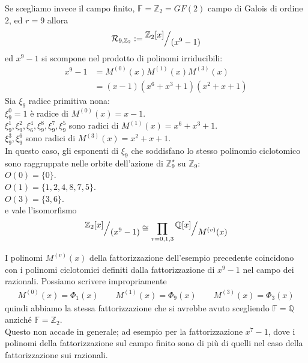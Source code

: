 \begin{esempio} \label{ese:fattor2_9}
Se scegliamo invece il campo finito,
$\mathbb{F} = \mathbb{Z}_{2} = GF(2)$ campo di Galois di ordine $2$, ed
$r = 9$ allora
\begin{align*}
  \mathcal{R}_{9, \mathbb{Z}_{2}} 
       := \quotient{\mathbb{Z}_{2} \lbrack x \rbrack  }{(x^{9} - 1)} 
\end{align*}
ed $x^{9}-1$ si scompone nel prodotto di polinomi irriducibili:
\begin{align*}
  x^9 - 1 &= M^{(0)}(x) M^{(1)}(x) M^{(3)}(x) \\
          &= (x-1)(x^6+x^3+1)(x^2+x+1)
\end{align*}
Sia $\xi_{9}$ radice primitiva nona:\\
$\xi_{9}^{0} = 1$ è radice di $M^{(0)}(x)= x-1$.\\
$\xi_{9}^{1},\xi_{9}^{2}, \xi_{6}^{4}, \xi_{9}^{8}, \xi_{9}^{7},\xi_{9}^{5} $
sono radici di $M^{(1)}(x) = x^6+x^3+1$.\\
$\xi_{9}^{3}, \xi_{9}^{6}$ sono radici di $M^{(3)}(x) = x^2+x+1$.\\
In questo caso, gli esponenti di $\xi_{9}$ che soddisfano lo
stesso polinomio ciclotomico sono raggruppate nelle orbite dell'azione di
$\mathbb{Z}_{9}^{\star}$ su $\mathbb{Z}_{9}$: \\
$O(0)= \lbrace 0 \rbrace$.\\
$O(1)= \lbrace 1,2,4,8,7,5 \rbrace$.\\
$O(3)= \lbrace 3,6 \rbrace$.\\
e vale l'isomorfismo
\begin{align*}
\quotient{\mathbb{Z}_{2} \lbrack x \rbrack  }{(x^{9} - 1)}
\cong
\prod_{v = 0,1,3} \quotient{\mathbb{Q} \lbrack x \rbrack  }{M^{(v)}(x)}
\end{align*}
\end{esempio}

I polinomi $M^{(v)}(x)$ della fattorizzazione dell'esempio precedente coincidono
con i polinomi ciclotomici definiti dalla fattorizzazione di $x^9 - 1$ nel
campo dei razionali. Possiamo scrivere impropriamente
\begin{align*}
   M^{(0)}(x) = \Phi_{1}(x) \qquad M^{(1)}(x) = \Phi_{9}(x) 
                            \qquad M^{(3)}(x) = \Phi_{3}(x)
\end{align*}
quindi abbiamo la stessa
fattorizzazione che si avrebbe avuto
scegliendo $\mathbb{F} = \mathbb{Q}$ anziché $\mathbb{F} = \mathbb{Z}_{2}$. \\
Questo non accade in generale; ad esempio per la fattorizzazione $x^7 - 1$,
dove i polinomi della fattorizzazione sul campo finito sono di più di quelli
nel caso della fattorizzazione sui razionali.

